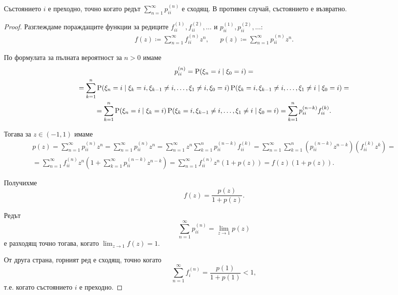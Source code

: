 \documentclass[numbers=endperiod, DIV=15, bibliography=totocnumbered]{scrartcl}
\begin{document}
\begin{theorem}\label{thm:trans-iff-divergent}
  Състоянието $i$ е преходно, точно когато редът $\sum_{n=1}^\infty p^{(n)}_{ii}$ е сходящ. В противен случай, състоянието е възвратно.
\end{theorem}
\begin{proof}
  Разглеждаме пораждащите функции за редиците $f_{ii}^{(1)}, f_{ii}^{(2)}, \ldots$ и $p_{ii}^{(1)}, p_{ii}^{(2)}, \ldots$:
  \begin{align*}
    f(z) \coloneqq \sum_{n=1}^\infty f_{ii}^{(n)} z^n,
    &&
    p(z) \coloneqq \sum_{n=1}^\infty p_{ii}^{(n)} z^n.
  \end{align*}

  По формулата за пълната вероятност за $n > 0$ имаме
  \begin{multline*}
    p_{ii}^{(n)}
    =
    \operatorname{P}(\xi_n = i \mid \xi_0 = i)
    = \\ =
    \sum_{k=1}^n \operatorname{P}(\xi_n = i \mid \xi_k = i, \xi_{k-1} \neq i, \ldots, \xi_1 \neq i, \xi_0 = i) \operatorname{P}(\xi_k = i, \xi_{k-1} \neq i, \ldots, \xi_1 \neq i \mid \xi_0 = i)
    = \\ =
    \sum_{k=1}^n \operatorname{P}(\xi_n = i \mid \xi_k = i) \operatorname{P}(\xi_k = i, \xi_{k-1} \neq i, \ldots, \xi_1 \neq i \mid \xi_0 = i)
    =
    \sum_{k=1}^n p_{ii}^{(n-k)} f_{ii}^{(k)}.
  \end{multline*}

  Тогава за $z \in (-1, 1)$ имаме
  \begin{multline*}
    p(z)
    =
    \sum_{n=1}^\infty p_{ii}^{(n)} z^n
    =
    \sum_{n=1}^\infty p_{ii}^{(n)} z^n
    =
    \sum_{n=1}^\infty z^n \sum_{k=1}^n p_{ii}^{(n-k)} f_{ii}^{(k)}
    =
    \sum_{n=1}^\infty \sum_{k=1}^n (p_{ii}^{(n-k)} z^{n-k}) (f_{ii}^{(k)} z^k)
    = \\ =
    \sum_{n=1}^\infty f_{ii}^{(n)} z^n \left( 1 + \sum_{k=1}^\infty p_{ii}^{(n-k)} z^{n-k} \right)
    =
    \sum_{n=1}^\infty f_{ii}^{(n)} z^n (1 + p(z))
    =
    f(z) (1 + p(z)).
  \end{multline*}

  Получихме
  \begin{displaymath}
    f(z) = \frac {p(z)} {1 + p(z)}.
  \end{displaymath}

  Редът
  \begin{displaymath}
    \sum_{n=1}^\infty p^{(n)}_{ii} = \lim_{z \to 1} p(z)
  \end{displaymath}
  е разходящ точно тогава, когато $\lim_{z \to 1} f(z) = 1$.

  От друга страна, горният ред е сходящ, точно когато
  \begin{displaymath}
    \sum_{n=1}^\infty f_i^{(n)} = \frac {p(1)} {1 + p(1)} < 1,
  \end{displaymath}
  т.е. когато състоянието $i$ е преходно.
\end{proof}
\end{document}
